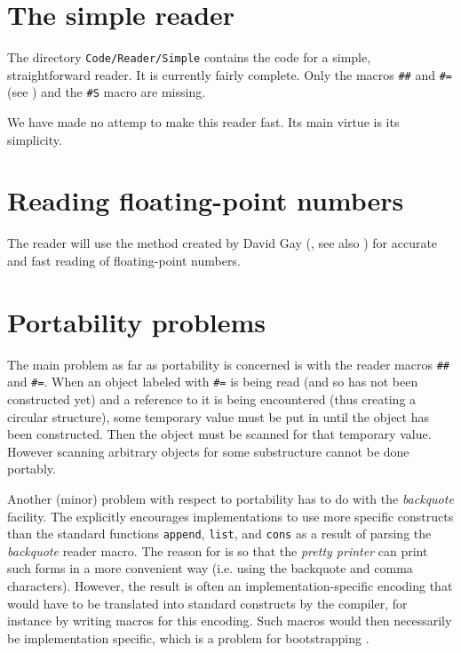\section{The simple reader}

The directory \texttt{Code/Reader/Simple} contains the code for a
simple, straightforward reader.  It is currently fairly complete.
Only the macros \texttt{\#\#} and \texttt{\#=} (see
) and the \texttt{\#S} macro
are missing.  

We have made no attemp to make this reader fast.  Its main virtue is
its simplicity.  

\section{Reading floating-point numbers}

The reader will use the method created by David Gay
(\cite{Gay90correctlyrounded}, see also
\cite{Clinger:1990:RFP:93542.93557}) for accurate and fast reading of
floating-point numbers.

\section{Portability problems}
\label{sec-reader-portability-problems}

The main problem as far as portability is concerned is with the reader
macros \texttt{\#\#} and \texttt{\#=}.  When an object labeled with
\texttt{\#=} is being read (and so has not been constructed yet) and a
reference to it is being encountered (thus creating a circular
structure), some temporary value must be put in until the object has
been constructed.  Then the object must be scanned for that temporary
value.  However scanning arbitrary objects for some substructure
cannot be done portably.

Another (minor) problem with respect to portability has to do with the
\emph{backquote} facility.  The \hs{} explicitly encourages
implementations to use more specific constructs than the standard
\cl{} functions \texttt{append}, \texttt{list}, and \texttt{cons} as a
result of parsing the \emph{backquote} reader macro.  The reason for
is so that the \emph{pretty printer} can print such forms in a more
convenient way (i.e. using the backquote and comma characters).
However, the result is often an implementation-specific encoding that
would have to be translated into standard \cl{} constructs by the
compiler, for instance by writing macros for this encoding.  Such
macros would then necessarily be implementation specific, which is a
problem for bootstrapping \sysname{}.  


